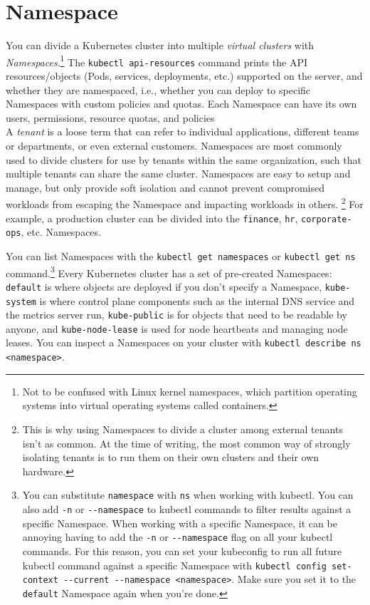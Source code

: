 \documentclass[8pt, table, xcdraw]{article}%
\begin{document}
\section{Namespace}

You can divide a Kubernetes cluster into multiple \emph{virtual clusters} with \emph{Namespaces}.\footnote{Not to be confused with Linux kernel namespaces, which partition operating systems into virtual operating systems called containers.} The \lstinline{kubectl api-resources} command prints the API resources/objects (Pods, services, deployments, etc.) supported on the server, and whether they are namespaced, i.e., whether you can deploy to specific Namespaces with custom policies and quotas. Each Namespace can have its own users, permissions, resource quotas, and policies\\
A \emph{tenant} is a loose term that can refer to individual applications, different teams or departments, or even external customers. Namespaces are most commonly used to divide clusters for use by tenants within the same organization, such that multiple tenants can share the same cluster. Namespaces are easy to setup and manage, but only provide soft isolation and cannot prevent compromised workloads from escaping the Namespace and impacting workloads in others. \footnote{This is why using Namespaces to divide a cluster among external tenants isn’t as common. At the time of writing, the most common way of strongly isolating tenants is to run them on their own clusters and their own hardware.} For example, a production cluster can be divided into the \lstinline{finance}, \lstinline{hr}, \lstinline{corporate-ops}, etc. Namespaces.

You can list Namespaces with the \lstinline{kubectl get namespaces} or \lstinline{kubectl get ns} command.\footnote{You can substitute \lstinline{namespace} with \lstinline{ns} when working with kubectl. You can also add \lstinline{-n} or \lstinline{--namespace} to kubectl commands to filter results against a specific Namespace. When working with a specific Namespace, it can be annoying having to add the \lstinline{-n} or \lstinline{--namespace} flag on all your kubectl commands. For this reason, you can set your kubeconfig to run all future kubectl command against a specific Namespace with \lstinline{kubectl config set-context --current --namespace <namespace>}. Make sure you set it to the \lstinline{default} Namespace again when you're done.} Every Kubernetes cluster has a set of pre-created Namespaces: \lstinline{default} is where objects are deployed if you don't specify a Namespace, \lstinline{kube-system} is where control plane components such as the internal DNS service and the metrics server run, \lstinline{kube-public} is for objects that need to be readable by anyone, and \lstinline{kube-node-lease} is used for node heartbeats and managing node leases. You can inspect a Namespaces on your cluster with \lstinline{kubectl describe ns <namespace>}.
\end{document}
